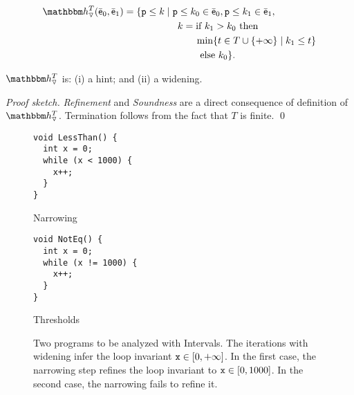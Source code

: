 \documentclass[sttt]{svjour}
\newcommand{\sopra}{}
\begin{document}
\begin{small}
  \begin{align*}
    \hint{\widening}^T(\ael{e}_0,\ael{e}_1) =  \{ \code{p} \leq k \mid \code{p} & \leq k_0\in \ael{e}_0, \code{p} \leq k_1\in \ael{e}_1, \\
    & k = \text{if } k_1 > k_0 \text{ then } \\
    & \qquad\mathrm{min}\{ t \in T \cup \{ +\infty \} \mid k_1 \leq t \} \\
    & \qquad \text{ else }  k_0\}.
  \end{align*}
\end{small}
\begin{lemma}
$\hint{\widening}^T$ is: (i) a hint; and (ii) a widening.
\end{lemma}
\textit{Proof sketch.}
\textit{Refinement}  and \textit{Soundness} are a direct consequence of definition of $\hint{\widening}^T$.
Termination follows from the fact that $T$ is finite.
\qed


\begin{figure}%
\centering
\begin{subfloat}
  \begin{minipage}{3cm}
\begin{verbatim}
void LessThan() {
  int x = 0;
  while (x < 1000) {
    x++;
  }
}
\end{verbatim}
  \end{minipage}
  \caption{Narrowing}
  \label{fig:tresholds1}
\end{subfloat}    
\qquad 
\begin{subfloat}
  \begin{minipage}{2.5cm}
\begin{verbatim}
void NotEq() {
  int x = 0;
  while (x != 1000) {
    x++;
  }
}
\end{verbatim}
  \end{minipage}
  \caption{Thresholds}
  \label{fig:tresholds2}
\end{subfloat}
\vspace{-0.2cm}
\caption{Two programs to be analyzed with Intervals.
  The iterations with widening infer the loop invariant $\mathtt{x} \in [0,+\infty]$.
  In the first case, the narrowing step refines the loop invariant to $\mathtt{x} \in [0, 1000]$.
  In the second case, the narrowing fails to refine it.}
\label{fig:tresholds}
\end{figure}
\end{document}
